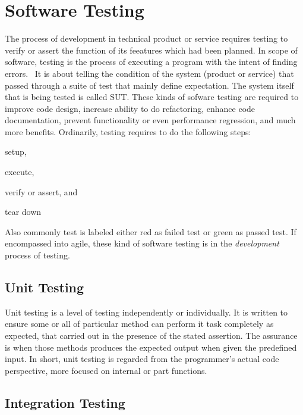 \section{Software Testing}
\label{sec:software-testing}

The process of development in technical product or service requires testing to verify or assert the function of its feeatures which had been planned.
In scope of software, testing is the process of executing a program with the intent of finding errors.~\autocite{Myers:2012:Testing:6}
It is about telling the condition of the system (product or service) that passed through a suite of test that mainly define expectation.
The system itself that is being tested is called \ac{SUT}.
These kinds of sofware testing are required to improve code design, increase ability to do refactoring, enhance code documentation, prevent functionality or even performance regression, and much more benefits.
Ordinarily, testing requires to do the following steps:
\begin{inparaenum}[\itshape 1\upshape)]
\item setup,
\item execute,
\item verify or assert, and
\item tear down
\end{inparaenum}
Also commonly test is labeled either red as failed test or green as passed test.
If encompassed into agile, these kind of software testing is in the \textit{development} process of testing.

\subsection{Unit Testing}

Unit testing is a level of testing independently or individually.
It is written to ensure some or all of particular method can perform it task completely as expected, that carried out in the presence of the stated assertion.
The assurance is when those methods produces the expected output when given the predefined input.
In short, unit testing is regarded from the programmer's actual code perspective, more focused on internal or part functions.

\subsection{Integration Testing}

